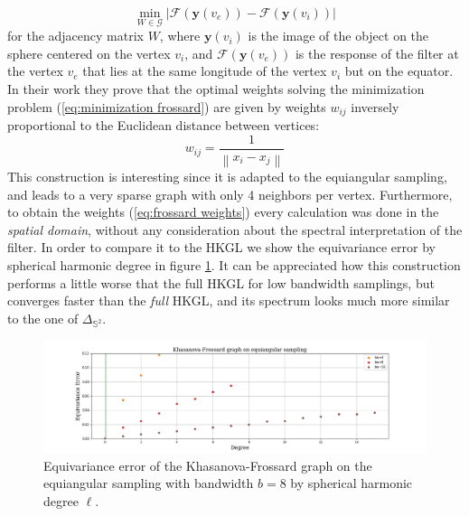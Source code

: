 \documentclass{article} %
\newcommand{\norm}[1]{\left\lVert#1\right\rVert}
\begin{document}
\begin{equation}\label{eq:minimization frossard}
	\min_{W\in\mathcal G} \left|\mathcal{F}\left(\mathbf{y}\left(v_{ e}\right)\right)-\mathcal{F}\left(\mathbf{y}\left(v_{ i}\right)\right)\right|
\end{equation}
for the adjacency matrix $W$, where $\mathbf y(v_i)$ is the image of the object on the sphere centered on the vertex $v_i$, and $\mathcal F (\mathbf y(v_e))$ is the response of the filter at the vertex $v_e$ that lies at the same longitude of the vertex $v_i$ but on the equator. In their work they prove that the optimal weights solving the minimization problem (\ref{eq:minimization frossard}) are given by weights $w_{ij}$ inversely proportional to the Euclidean distance between vertices:
\begin{equation}\label{eq:frossard weights}
	w_{ij} = \frac{1}{\norm{x_i-x_j}}
\end{equation}
This construction is interesting since it is adapted to the equiangular sampling, and leads to a very sparse graph with only 4 neighbors per vertex. Furthermore, to obtain the weights (\ref{eq:frossard weights}) every calculation was done in the \textit{spatial domain}, without any consideration about the spectral interpretation of the filter. In order to compare it to the HKGL we show the equivariance error by spherical harmonic degree in figure \ref{fig:Equivariance error of the Frossard-Khasanove graph}. It can be appreciated how this construction performs a little worse that the full HKGL for low bandwidth samplings, but converges faster than the \textit{full} HKGL, and its spectrum looks much more similar to the one of $\Delta_{\mathbb S^2}$.

\begin{figure}[h!]
	\centering
	\includegraphics[width=\textwidth]{figures/KhasanovaFrossardgraphonequiangularsampling.png}

	\caption{\label{fig:Equivariance error of the Frossard-Khasanove graph}Equivariance error of the Khasanova-Frossard graph on the equiangular sampling with bandwidth $b=8$ by spherical harmonic degree $\ell$.}
\end{figure}
\end{document}
